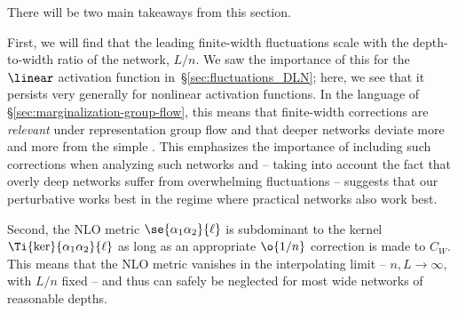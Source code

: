 There will be two main takeaways from this section.
\bi
\item First, we will find that the leading finite-width fluctuations scale with the depth-to-width ratio of the network, $L/n$. We saw the importance of this  for the $\linear$ activation function in~\S\ref{sec:fluctuations_DLN}; here, we see that it persists very generally for nonlinear activation functions.
In the language of \S\ref{sec:marginalization-group-flow}, this means that finite-width corrections are \emph{relevant} under representation group flow and that deeper networks deviate more and more from the simple . This emphasizes the importance of including such corrections when analyzing such networks and -- taking into account the fact that overly deep networks suffer from overwhelming fluctuations -- suggests
that our perturbative  works best in the regime where practical networks also work best.

\item Second,
the NLO metric $\se{\alpha_1\alpha_2}{\ell}$ is subdominant to the kernel $\Ti{\ker}{\alpha_1\alpha_2}{\ell}$ as long as an appropriate $\o{1/n}$ correction is made to 
$C_W$. This means that the NLO metric vanishes in the interpolating limit -- $n,L\rightarrow\infty$, with $L/n$ fixed -- and thus can safely be neglected
 for most wide networks of reasonable depths.
\ei



